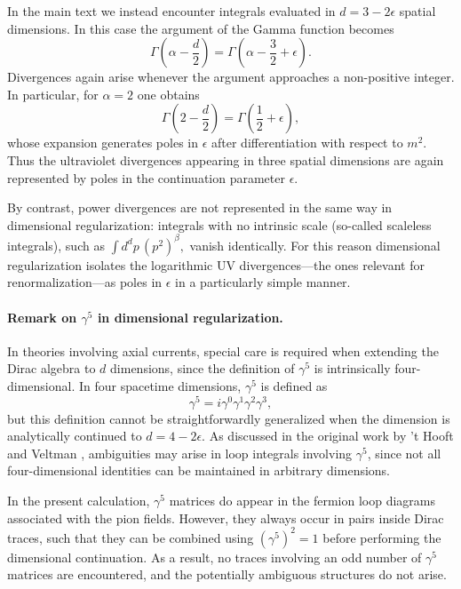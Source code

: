 In the main text we instead encounter integrals evaluated in
$d=3-2\epsilon$ spatial dimensions. In this case the argument of the
Gamma function becomes
\begin{equation}
\Gamma\!\left(\alpha-\frac{d}{2}\right)
=
\Gamma\!\left(\alpha-\frac{3}{2}+\epsilon\right).
\end{equation}
Divergences again arise whenever the argument approaches a
non-positive integer. In particular, for $\alpha=2$ one obtains
\begin{equation}
\Gamma\!\left(2-\frac{d}{2}\right)
=
\Gamma\!\left(\frac{1}{2}+\epsilon\right),
\end{equation}
whose expansion generates poles in $\epsilon$ after differentiation
with respect to $m^2$. Thus the ultraviolet divergences appearing in
three spatial dimensions are again represented by poles in the
continuation parameter $\epsilon$.

By contrast, power divergences are not represented in the same way in
dimensional regularization: integrals with no intrinsic scale
(so-called scaleless integrals), such as
\(
\int d^d p\,(p^2)^\beta,
\)
vanish identically. For this reason dimensional regularization
isolates the logarithmic UV divergences—the ones relevant for
renormalization—as poles in $\epsilon$ in a particularly simple
manner.

\paragraph{Remark on $\gamma^5$ in dimensional regularization.}
In theories involving axial currents, special care is required when
extending the Dirac algebra to $d$ dimensions, since the definition
of $\gamma^5$ is intrinsically four-dimensional. In four spacetime
dimensions, $\gamma^5$ is defined as
\begin{equation}
\gamma^5 = i\gamma^0\gamma^1\gamma^2\gamma^3 ,
\end{equation}
but this definition cannot be straightforwardly generalized when the
dimension is analytically continued to $d=4-2\epsilon$.
As discussed in the original work by 't Hooft and Veltman
\cite{tHooftVeltman1972}, ambiguities may arise in loop integrals
involving $\gamma^5$, since not all four-dimensional identities can
be maintained in arbitrary dimensions.

In the present calculation, $\gamma^5$ matrices do appear in the
fermion loop diagrams associated with the pion fields. However, they
always occur in pairs inside Dirac traces, such that they can be
combined using $(\gamma^5)^2 = 1$ before performing the dimensional
continuation. As a result, no traces involving an odd number of
$\gamma^5$ matrices are encountered, and the potentially ambiguous
structures do not arise.


